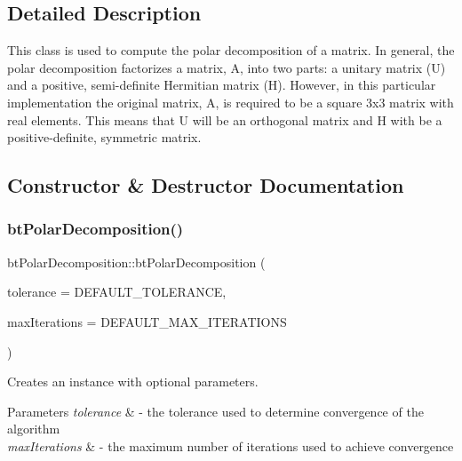 \subsection{Detailed Description}
This class is used to compute the polar decomposition of a matrix. In general, the polar decomposition factorizes a matrix, A, into two parts\+: a unitary matrix (U) and a positive, semi-\/definite Hermitian matrix (H). However, in this particular implementation the original matrix, A, is required to be a square 3x3 matrix with real elements. This means that U will be an orthogonal matrix and H with be a positive-\/definite, symmetric matrix. 

\subsection{Constructor \& Destructor Documentation}
\mbox{\label{classbtPolarDecomposition_aa346e3dcc8867ebd3944b51ab5b7fb1f}} 
\subsubsection{\texorpdfstring{bt\+Polar\+Decomposition()}{btPolarDecomposition()}\hspace{0.1cm}{\footnotesize\ttfamily [1/2]}}
{\footnotesize\ttfamily bt\+Polar\+Decomposition\+::bt\+Polar\+Decomposition (\begin{DoxyParamCaption}\item[{bt\+Scalar}]{tolerance = {\ttfamily DEFAULT\+\_\+TOLERANCE},  }\item[{unsigned int}]{max\+Iterations = {\ttfamily DEFAULT\+\_\+MAX\+\_\+ITERATIONS} }\end{DoxyParamCaption})}

Creates an instance with optional parameters.


\begin{DoxyParams}{Parameters}
{\em tolerance} & -\/ the tolerance used to determine convergence of the algorithm \\
\hline
{\em max\+Iterations} & -\/ the maximum number of iterations used to achieve convergence \\
\hline
\end{DoxyParams}
\mbox{\label{classbtPolarDecomposition_aa346e3dcc8867ebd3944b51ab5b7fb1f}} 
